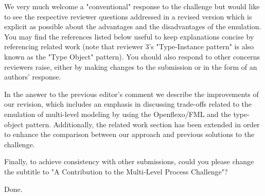 \documentclass[10pt]{article}
\begin{document}
\begin{response}{We very much welcome a "conventional" response to the challenge but would like to see the respective reviewer questions addressed in a revised version which is explicit as possible about the advantages and the disadvantages of the emulation. You may find the references listed below useful to keep explanations concise by referencing related work (note that reviewer 3's "Type-Instance pattern" is also known as the "Type Object" pattern). You should also respond to other concerns reviewers raise, either by making changes to the submission or in the form of an authors' response.}

In the answer to the previous editor's comment we describe the improvements of our revision, which includes an emphasis in discussing trade-offs related to the emulation of multi-level modeling by using the Openflexo/FML and the type-object pattern. Additionally, the related work section has been extended in order to enhance the comparison between our approach and previous solutions to the challenge.%

\end{response}


\begin{response}{Finally, to achieve consistency with other submissions, could you please change the subtitle to "A Contribution to the Multi-Level Process Challenge"?}

Done.
\end{response}

\pagebreak
\end{document}
